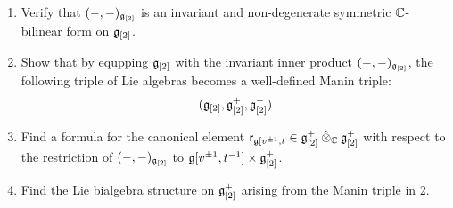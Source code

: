         \begin{question} \label{question: multiloop_lie_bialgebras}
            \begin{enumerate}
                \item Verify that $(-, -)_{\mathfrak{g}_{[2]}}$ is an invariant and non-degenerate symmetric $\mathbb{C}$-bilinear form on $\mathfrak{g}_{[2]}$.
                \item Show that by equpping $\mathfrak{g}_{[2]}$ with the invariant inner product $(-, -)_{\mathfrak{g}_{[2]}}$, the following triple of Lie algebras becomes a well-defined Manin triple:
                    $$(\mathfrak{g}_{[2]}, \mathfrak{g}_{[2]}^+, \mathfrak{g}_{[2]}^-)$$
                \item Find a formula for the canonical element $\sfr_{\g[v^{\pm 1}, t} \in \g_{[2]}^+ \hattensor_{\bbC} \g_{[2]}^+$ with respect to the restriction of $(-, -)_{\mathfrak{g}_{[2]}}$ to $\g[v^{\pm 1}, t^{-1}] \x \g_{[2]}^+$.
                \item Find the Lie bialgebra structure on $\mathfrak{g}_{[2]}^+$ arising from the Manin triple in 2.
            \end{enumerate}
        \end{question}
